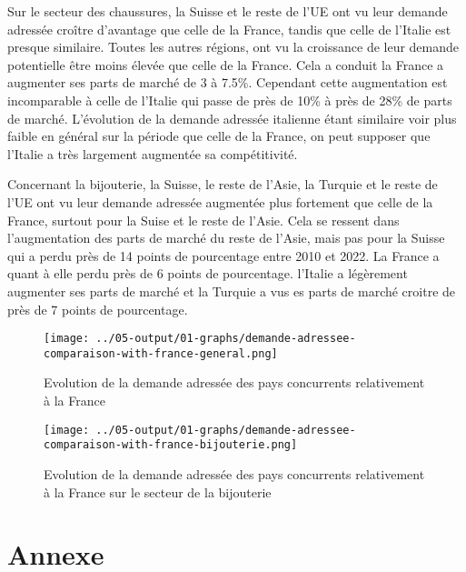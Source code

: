 \documentclass[french,10pt,a4paper]{article}
\begin{document}
Sur le secteur des chaussures, la Suisse et le reste de l'UE ont vu leur demande adressée croître d'avantage que celle de la France, tandis que celle de l'Italie est presque similaire. Toutes les autres régions, ont vu la croissance de leur demande potentielle être moins élevée que celle de la France. Cela a conduit la France a augmenter ses parts de marché de 3 à 7.5\%. Cependant cette augmentation est incomparable à celle de l'Italie qui passe de près de 10\% à près de 28\% de parts de marché. L'évolution de la demande adressée italienne étant similaire voir plus faible en général sur la période que celle de la France, on peut supposer que l'Italie a très largement augmentée sa compétitivité.

Concernant la bijouterie, la Suisse, le reste de l'Asie, la Turquie et le reste de l'UE ont vu leur demande adressée augmentée plus fortement que celle de la France, surtout pour la Suise et le reste de l'Asie. Cela se ressent dans l'augmentation des parts de marché du reste de l'Asie, mais pas pour la Suisse qui a perdu près de 14 points de pourcentage entre 2010 et 2022. La France a quant à elle perdu près de 6 points de pourcentage. l'Italie a légèrement augmenter ses parts de marché et la Turquie a vus es parts de marché croitre de près de 7 points de pourcentage. 


\begin{figure}[!h]
  \centering \texttt{[image: ../05-output/01-graphs/demande-adressee-comparaison-with-france-general.png]}
  \caption{Evolution de la demande adressée des pays concurrents relativement à la France}
  \label{fig:demande-adressee-comparaison-with-france-general}
\end{figure}

\begin{figure}[!h]
  \centering \texttt{[image: ../05-output/01-graphs/demande-adressee-comparaison-with-france-bijouterie.png]}
  \caption{Evolution de la demande adressée des pays concurrents relativement à la France sur le secteur de la bijouterie}
  \label{fig:demande-adressee-comparaison-with-france-bijouterie}
\end{figure}


\newpage
\section{Annexe}



 
\newpage


\end{document}
